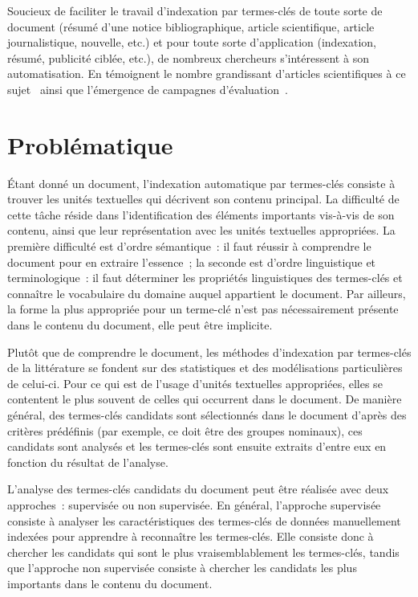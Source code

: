     Soucieux de faciliter le travail d'indexation par termes-clés de toute sorte
    de document (résumé d'une notice bibliographique, article scientifique,
    article journalistique, nouvelle, etc.) et pour toute sorte d'application
    (indexation, résumé, publicité ciblée, etc.), de nombreux chercheurs
    s'intéressent à son automatisation. En témoignent le nombre grandissant
    d'articles scientifiques à ce sujet~\cite{hasan2014state_of_the_art} ainsi
    que l'émergence de campagnes
    d'évaluation~\cite{kim2010semeval,paroubek2012deft}.


  \section{Problématique}
  \label{sec:main-introduction-problem_statement}
    Étant donné un document, l'indexation automatique par termes-clés consiste à
    trouver les unités textuelles qui décrivent son contenu principal. La
    difficulté de cette tâche réside dans l'identification des éléments
    importants vis-à-vis de son contenu, ainsi que leur représentation avec les
    unités textuelles appropriées. La première difficulté est d'ordre
    sémantique~: il faut réussir à comprendre le document pour en extraire
    l'essence~; la seconde est d'ordre linguistique et terminologique~: il faut
    déterminer les propriétés linguistiques des termes-clés et connaître le
    vocabulaire du domaine auquel appartient le document. Par ailleurs, la forme
    la plus appropriée pour un terme-clé n'est pas nécessairement présente dans
    le contenu du document, elle peut être implicite.

    Plutôt que de comprendre le document, les méthodes d'indexation par
    termes-clés de la littérature se fondent sur des statistiques et
    des modélisations particulières de celui-ci. Pour ce qui est de l'usage
    d'unités textuelles appropriées, elles se contentent le plus souvent de
    celles qui occurrent dans le document. De manière général, des
    termes-clés candidats sont sélectionnés dans le document d'après des
    critères prédéfinis (par exemple, ce doit être des groupes nominaux), ces
    candidats sont analysés et les termes-clés sont ensuite extraits d'entre eux
    en fonction du résultat de l'analyse.

    L'analyse des termes-clés candidats du document peut être réalisée avec deux
    approches~: supervisée ou non supervisée. En général, l'approche supervisée
    consiste à analyser les caractéristiques des termes-clés de données
    manuellement indexées pour apprendre à reconnaître les termes-clés. Elle
    consiste donc à chercher les candidats qui sont le plus vraisemblablement
    les termes-clés, tandis que l'approche non supervisée consiste à chercher
    les candidats les plus importants dans le contenu du document.
    
